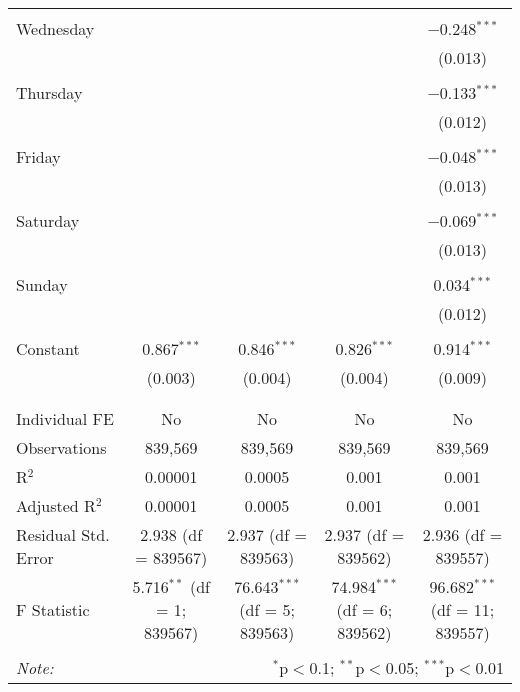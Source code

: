 \documentclass[
]{article}
\begin{document}
\begin{table}[!htbp]
{\begin{tabular}{@{\extracolsep{5pt}}lcccc}
  & & & & \\ 
 Wednesday &  &  &  & $-$0.248$^{***}$ \\ 
  &  &  &  & (0.013) \\ 
  & & & & \\ 
 Thursday &  &  &  & $-$0.133$^{***}$ \\ 
  &  &  &  & (0.012) \\ 
  & & & & \\ 
 Friday &  &  &  & $-$0.048$^{***}$ \\ 
  &  &  &  & (0.013) \\ 
  & & & & \\ 
 Saturday &  &  &  & $-$0.069$^{***}$ \\ 
  &  &  &  & (0.013) \\ 
  & & & & \\ 
 Sunday &  &  &  & 0.034$^{***}$ \\ 
  &  &  &  & (0.012) \\ 
  & & & & \\ 
 Constant & 0.867$^{***}$ & 0.846$^{***}$ & 0.826$^{***}$ & 0.914$^{***}$ \\ 
  & (0.003) & (0.004) & (0.004) & (0.009) \\ 
  & & & & \\ 
\hline \\[-1.8ex] 
Individual FE & No & No & No & No \\ 
Observations & 839,569 & 839,569 & 839,569 & 839,569 \\ 
R$^{2}$ & 0.00001 & 0.0005 & 0.001 & 0.001 \\ 
Adjusted R$^{2}$ & 0.00001 & 0.0005 & 0.001 & 0.001 \\ 
Residual Std. Error & 2.938 (df = 839567) & 2.937 (df = 839563) & 2.937 (df = 839562) & 2.936 (df = 839557) \\ 
F Statistic & 5.716$^{**}$ (df = 1; 839567) & 76.643$^{***}$ (df = 5; 839563) & 74.984$^{***}$ (df = 6; 839562) & 96.682$^{***}$ (df = 11; 839557) \\ 
\hline 
\hline \\[-1.8ex] 
\textit{Note:}  & \multicolumn{4}{r}{$^{*}$p$<$0.1; $^{**}$p$<$0.05; $^{***}$p$<$0.01} \\ 
\end{tabular}
} 
\end{table} 
\newpage
\end{document}
